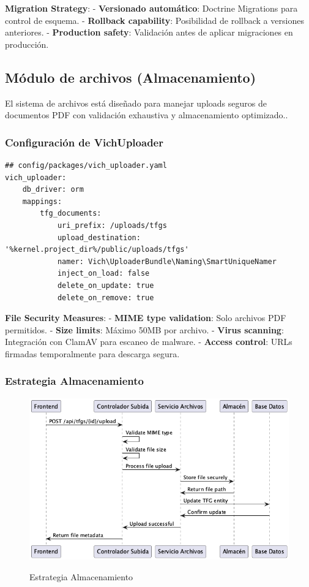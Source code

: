 \documentclass[12pt,a4paper,oneside]{report}
\providecommand{\pandocbounded}[1]{#1}
\begin{document}
\textbf{Migration Strategy}: - \textbf{Versionado automático}: Doctrine
Migrations para control de esquema. - \textbf{Rollback capability}:
Posibilidad de rollback a versiones anteriores. - \textbf{Production
safety}: Validación antes de aplicar migraciones en producción.

\subsection{Módulo de archivos
(Almacenamiento)}\label{muxf3dulo-de-archivos-almacenamiento}

El sistema de archivos está diseñado para manejar uploads seguros de
documentos PDF con validación exhaustiva y almacenamiento optimizado..

\subsubsection{Configuración de
VichUploader}\label{configuraciuxf3n-de-vichuploader}

\begin{lstlisting}
## config/packages/vich_uploader.yaml
vich_uploader:
    db_driver: orm
    mappings:
        tfg_documents:
            uri_prefix: /uploads/tfgs
            upload_destination: '%kernel.project_dir%/public/uploads/tfgs'
            namer: Vich\UploaderBundle\Naming\SmartUniqueNamer
            inject_on_load: false
            delete_on_update: true
            delete_on_remove: true
\end{lstlisting}

\textbf{File Security Measures}: - \textbf{MIME type validation}: Solo
archivos PDF permitidos. - \textbf{Size limits}: Máximo 50MB por
archivo. - \textbf{Virus scanning}: Integración con ClamAV para escaneo
de malware. - \textbf{Access control}: URLs firmadas temporalmente para
descarga segura.

\subsubsection{Estrategia
Almacenamiento}\label{estrategia-almacenamiento}

\begin{figure}
\centering
\pandocbounded{\includegraphics[keepaspectratio,alt={Estrategia Almacenamiento}]{processed/images/05_diseno_plantuml_2.png}}
\caption{Estrategia Almacenamiento}
\end{figure}
\end{document}

